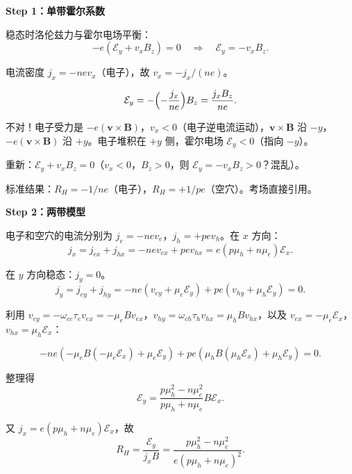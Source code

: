 \begin{derivationbox}
\textbf{Step 1：单带霍尔系数}

稳态时洛伦兹力与霍尔电场平衡：
\[
-e(\mathcal{E}_y+v_x B_z)=0\quad\Rightarrow\quad \mathcal{E}_y=-v_x B_z.
\]

电流密度 $j_x=-nev_x$（电子），故 $v_x=-j_x/(ne)$。

\[
\mathcal{E}_y=-\Bigl(-\frac{j_x}{ne}\Bigr)B_z=\frac{j_x B_z}{ne}.
\]

不对！电子受力是 $-e(\mathbf{v}\times\mathbf{B})$，$v_x<0$（电子逆电流运动），$\mathbf{v}\times\mathbf{B}$ 沿 $-y$，$-e(\mathbf{v}\times\mathbf{B})$ 沿 $+y$。电子堆积在 $+y$ 侧，霍尔电场 $\mathcal{E}_y<0$（指向 $-y$）。

重新：$\mathcal{E}_y+v_x B_z=0$（$v_x<0$，$B_z>0$，则 $\mathcal{E}_y=-v_x B_z>0$？混乱）。

标准结果：$R_H=-1/ne$（电子），$R_H=+1/pe$（空穴）。考场直接引用。

\textbf{Step 2：两带模型}

电子和空穴的电流分别为 $j_e=-ne v_e$，$j_h=+pe v_h$。在 $x$ 方向：
\[
j_x=j_{ex}+j_{hx}=-nev_{ex}+pev_{hx}=e(p\mu_h+n\mu_e)\mathcal{E}_x.
\]

在 $y$ 方向稳态：$j_y=0$。
\[
j_y=j_{ey}+j_{hy}=-ne(v_{ey}+\mu_e\mathcal{E}_y)+pe(v_{hy}+\mu_h\mathcal{E}_y)=0.
\]

利用 $v_{ey}=-\omega_{ce}\tau_e v_{ex}=-\mu_e B v_{ex}$，$v_{hy}=\omega_{ch}\tau_h v_{hx}=\mu_h B v_{hx}$，以及 $v_{ex}=-\mu_e\mathcal{E}_x$，$v_{hx}=\mu_h\mathcal{E}_x$：

\[
-ne(-\mu_e B(-\mu_e\mathcal{E}_x)+\mu_e\mathcal{E}_y)+pe(\mu_h B(\mu_h\mathcal{E}_x)+\mu_h\mathcal{E}_y)=0.
\]

整理得
\[
\mathcal{E}_y=\frac{p\mu_h^2-n\mu_e^2}{p\mu_h+n\mu_e}B\mathcal{E}_x.
\]

又 $j_x=e(p\mu_h+n\mu_e)\mathcal{E}_x$，故
\[
R_H=\frac{\mathcal{E}_y}{j_x B}=\frac{p\mu_h^2-n\mu_e^2}{e(p\mu_h+n\mu_e)^2}.
\]
\end{derivationbox}

\vspace{1em}
